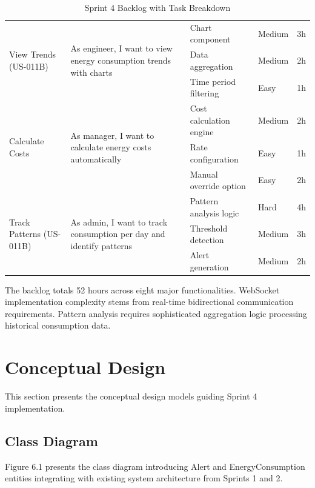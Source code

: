 \begin{table}[H]
\begin{tabular}{|p{2.5cm}|p{4cm}|p{3.2cm}|p{2.2cm}|p{1.5cm}|}
\multirow{3}{2.5cm}{View Trends (US-011B)} & 
\multirow{3}{4cm}{As engineer, I want to view energy consumption trends with charts}
& Chart component & Medium & 3h \\
\cline{3-5}
& & Data aggregation & Medium & 2h \\
\cline{3-5}
& & Time period filtering & Easy & 1h \\
\hline

\multirow{3}{2.5cm}{Calculate Costs} & 
\multirow{3}{4cm}{As manager, I want to calculate energy costs automatically}
& Cost calculation engine & Medium & 2h \\
\cline{3-5}
& & Rate configuration & Easy & 1h \\
\cline{3-5}
& & Manual override option & Easy & 2h \\
\hline

\multirow{3}{2.5cm}{Track Patterns (US-011B)} & 
\multirow{3}{4cm}{As admin, I want to track consumption per day and identify patterns}
& Pattern analysis logic & Hard & 4h \\
\cline{3-5}
& & Threshold detection & Medium & 3h \\
\cline{3-5}
& & Alert generation & Medium & 2h \\
\hline

\end{tabular}
\caption{Sprint 4 Backlog with Task Breakdown}
\label{tab:sprint4_backlog}
\end{table}

The backlog totals 52 hours across eight major functionalities. WebSocket implementation complexity stems from real-time bidirectional communication requirements. Pattern analysis requires sophisticated aggregation logic processing historical consumption data.

\section{Conceptual Design}

This section presents the conceptual design models guiding Sprint 4 implementation.

\subsection{Class Diagram}

Figure 6.1 presents the class diagram introducing Alert and EnergyConsumption entities integrating with existing system architecture from Sprints 1 and 2.

